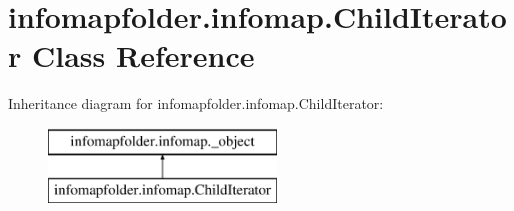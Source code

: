 \hypertarget{classinfomapfolder_1_1infomap_1_1ChildIterator}{}\section{infomapfolder.\+infomap.\+Child\+Iterator Class Reference}
\label{classinfomapfolder_1_1infomap_1_1ChildIterator}
Inheritance diagram for infomapfolder.\+infomap.\+Child\+Iterator\+:\begin{figure}[H]
\begin{center}
\leavevmode
\includegraphics[height=2.000000cm]{classinfomapfolder_1_1infomap_1_1ChildIterator}
\end{center}
\end{figure}
